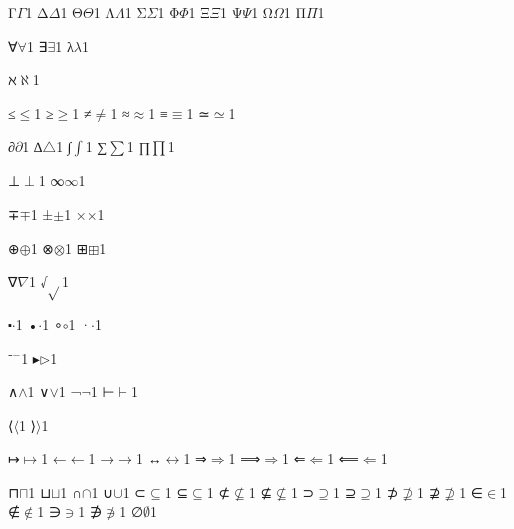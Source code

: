 {    {Γ}{{\ensuremath{\Gamma}}}1
    {Δ}{{\ensuremath{\Delta}}}1
    {Θ}{{\ensuremath{\Theta}}}1
    {Λ}{{\ensuremath{\Lambda}}}1
    {Σ}{{\color{symbolcolor}\ensuremath{\Sigma}}}1
    {Φ}{{\ensuremath{\Phi}}}1
    {Ξ}{{\ensuremath{\Xi}}}1
    {Ψ}{{\ensuremath{\Psi}}}1
    {Ω}{{\ensuremath{\Omega}}}1
    {Π}{{\color{symbolcolor}\ensuremath{\Pi}}}1

    {∀}{{\color{symbolcolor}\ensuremath{\forall}}}1
    {∃}{{\color{symbolcolor}\ensuremath{\exists}}}1
    {λ}{{\color{symbolcolor}\ensuremath{\lambda}}}1

    {ℵ}{{\ensuremath{\aleph}}}1

    {≤}{{\ensuremath{\leq}}}1
    {≥}{{\ensuremath{\geq}}}1
    {≠}{{\ensuremath{\neq}}}1
    {≈}{{\ensuremath{\approx}}}1
    {≡}{{\ensuremath{\equiv}}}1
    {≃}{{\ensuremath{\simeq}}}1

    {∂}{{\ensuremath{\partial}}}1
    {∆}{{\ensuremath{\triangle}}}1
    {∫}{{\ensuremath{\int}}}1
    {∑}{{\color{symbolcolor}\ensuremath{\sum}}}1
    {∏}{{\ensuremath{\prod}}}1

    {⊥}{{\ensuremath{\perp}}}1
    {∞}{{\ensuremath{\infty}}}1

    {∓}{{\ensuremath{\mp}}}1
    {±}{{\ensuremath{\pm}}}1
    {×}{{\ensuremath{\times}}}1

    {⊕}{{\ensuremath{\oplus}}}1
    {⊗}{{\ensuremath{\otimes}}}1
    {⊞}{{\ensuremath{\boxplus}}}1

    {∇}{{\ensuremath{\nabla}}}1
    {√}{{\ensuremath{\sqrt{}}}}1

    {⬝}{{\ensuremath{\cdot}}}1
    {•}{{\ensuremath{\cdot}}}1
    {∘}{{\ensuremath{\circ}}}1
    {·}{{\ensuremath{\cdot}}}1

    {⁻}{{\ensuremath{^{-}}}}1
    {▸}{{\ensuremath{\triangleright}}}1

    {∧}{{\ensuremath{\wedge}}}1
    {∨}{{\ensuremath{\vee}}}1
    {¬}{{\ensuremath{\neg}}}1
    {⊢}{{\ensuremath{\vdash}}}1

    {⟨}{{\ensuremath{\langle}}}1
    {⟩}{{\ensuremath{\rangle}}}1

    {↦}{{\ensuremath{\mapsto}}}1
    {←}{{\ensuremath{\leftarrow}}}1
    {→}{{\ensuremath{\rightarrow}}}1
    {↔}{{\ensuremath{\leftrightarrow}}}1
    {⇒}{{\ensuremath{\Rightarrow}}}1
    {⟹}{{\ensuremath{\Longrightarrow}}}1
    {⇐}{{\ensuremath{\Leftarrow}}}1
    {⟸}{{\ensuremath{\Longleftarrow}}}1

    {⊓}{{\ensuremath{\sqcap}}}1
    {⊔}{{\ensuremath{\sqcup}}}1
    {∩}{{\ensuremath{\cap}}}1
    {∪}{{\ensuremath{\cup}}}1
    {⊂}{{\ensuremath{\subseteq}}}1
    {⊆}{{\ensuremath{\subseteq}}}1
    {⊄}{{\ensuremath{\nsubseteq}}}1
    {⊈}{{\ensuremath{\nsubseteq}}}1
    {⊃}{{\ensuremath{\supseteq}}}1
    {⊇}{{\ensuremath{\supseteq}}}1
    {⊅}{{\ensuremath{\nsupseteq}}}1
    {⊉}{{\ensuremath{\nsupseteq}}}1
    {∈}{{\ensuremath{\in}}}1
    {∉}{{\ensuremath{\notin}}}1
    {∋}{{\ensuremath{\ni}}}1
    {∌}{{\ensuremath{\notni}}}1
    {∅}{{\ensuremath{\emptyset}}}1

}
